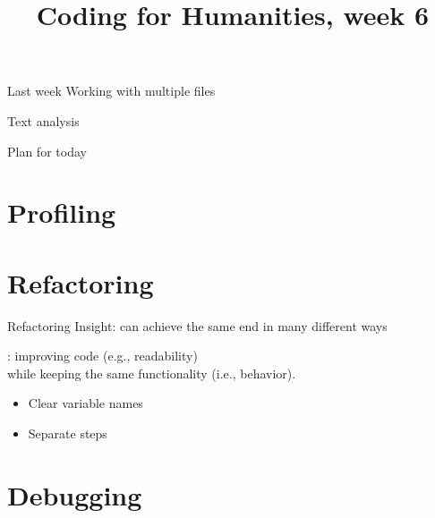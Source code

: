 \documentclass[aspectratio=169,usenames,dvipsnames]{beamer}
\title{Coding for Humanities, week 6}
\begin{document}
\begin{frame}
 \titlepage
\end{frame}

\begin{frame}{Last week}
    Working with multiple files

    Text analysis
\end{frame}

\begin{frame}{Plan for today}
 \tableofcontents
\end{frame}


\section{Profiling}
\frame{\tableofcontents[currentsection]}
\section{Refactoring}
\frame{\tableofcontents[currentsection]}

\begin{frame}{Refactoring}
	Insight: can achieve the same end in many different ways

	\pause
	\begin{definition}
		: improving code (e.g., readability) \\
			while keeping the same functionality (i.e., behavior).
	\end{definition}

	\begin{itemize}
		\item Clear variable names
		\item Separate steps
	\end{itemize}
\end{frame}

\section{Debugging}
\frame{\tableofcontents[currentsection]}
\end{document}
